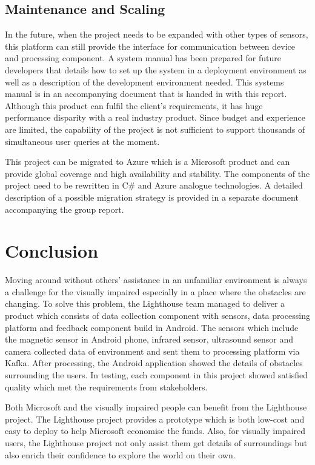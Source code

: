 \documentclass[prodmode,acmtosem]{acmsmall} %
\begin{document}
\subsection{Maintenance and Scaling}
In the future, when the project needs to be expanded with other types of sensors, this platform can still provide the interface for communication between device and processing component. A system manual has been prepared for future developers that details how to set up the system in a deployment environment as well as a description of the development environment needed. This systems manual is in an accompanying document that is handed in with this report.
Although this product can fulfil the client's requirements, it has huge performance disparity with a real industry product. Since budget and experience are limited, the capability of the project is not sufficient to support thousands of simultaneous user queries at the moment.

This project can be migrated to Azure which is a Microsoft product and can provide global coverage and high availability and stability. The components of the project need to be rewritten in C\# and Azure analogue technologies. A detailed description of a possible migration strategy is provided in a separate document accompanying the group report.


\section{Conclusion}
Moving around without others’ assistance in an unfamiliar environment is always a challenge for the visually impaired especially in a place where the obstacles are changing. To solve this problem, the Lighthouse team managed to deliver a product which consists of data collection component with sensors, data processing platform and feedback component build in Android. The sensors which include the magnetic sensor in Android phone, infrared sensor, ultrasound sensor and camera collected data of environment and sent them to processing platform via Kafka. After processing, the Android application showed the details of obstacles surrounding the users. In testing, each component in this project showed satisfied quality which met the requirements from stakeholders. 

Both Microsoft and the visually impaired people can benefit from the Lighthouse project. The Lighthouse project provides a prototype which is both low-cost and easy to deploy to help Microsoft economise the funds. Also, for visually impaired users, the Lighthouse project not only assist them get details of surroundings but also enrich their confidence to explore the world on their own. 
\end{document}

